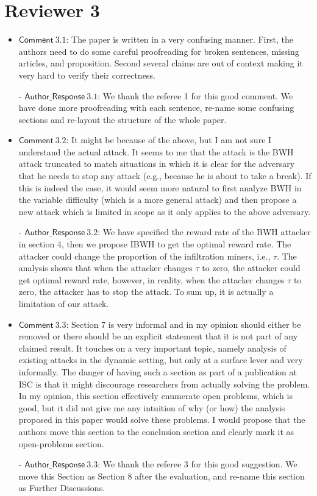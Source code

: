 \documentclass[]{article}
\newcommand{\AR}[1]{\mathsf{Author\_Response}\ #1}
\newcommand{\CM}[1]{{\mathsf{Comment}\ #1}}
\begin{document}
\section{Reviewer 3}
\begin{itemize}
	\item $\CM{3.1}$: The paper is written in a very confusing manner. First, the authors need to do some careful proofreading for broken sentences, missing articles, and proposition. Second several claims are out of context making it very hard to verify their correctness. 
    \item[-] $\AR{3.1}$: We thank the referee 1 for this good comment. We have done more proofreading with each sentence, re-name some confusing sections and re-layout the structure of the whole paper.



    \item $\CM{3.2}$: It might be because of the above, but I am not sure I understand the actual attack. It seems to me that the attack is the BWH attack truncated to match situations in which it is clear for the adversary that he needs to stop any attack (e.g., because he is about to take a break). If this is indeed the case, it would seem more natural to first analyze BWH in the variable difficulty (which is a more general attack) and then propose a new attack which is limited in scope as it only applies to the above adversary.
    \item[-] $\AR{3.2}$: We have specified the reward rate of the BWH attacker in section 4, then we propose IBWH to get the optimal reward rate. The attacker could change the proportion of the infiltration miners, i.e., $\tau$. The analysis shows that when the attacker changes $\tau$ to zero, the attacker could get optimal reward rate, however, in reality, when the attacker changes $\tau$ to zero, the attacker has to stop the attack. To sum up, it is actually a limitation of our attack.

\item $\CM{3.3}$: Section 7 is very informal and in my opinion should either be removed or there should be an explicit statement that it is not part of any claimed result. It touches on a very important topic, namely analysis of existing attacks in the dynamic setting, but only at a surface lever and very informally. The danger of having such a section as part of a publication at ISC is that it might discourage researchers from actually solving the problem. In my opinion, this section effectively enumerate open problems, which is good, but it did not give me any intuition of why (or how) the analysis proposed in this paper would solve these problems. I would propose that the authors move this section to the conclusion section and clearly mark it as open-problems section.
\item[-] $\AR{3.3}$: We thank the referee 3 for this good suggestion. We move this Section as Section 8 after the evaluation, and re-name this section as Further Discussions.


\end{itemize}
\end{document}
